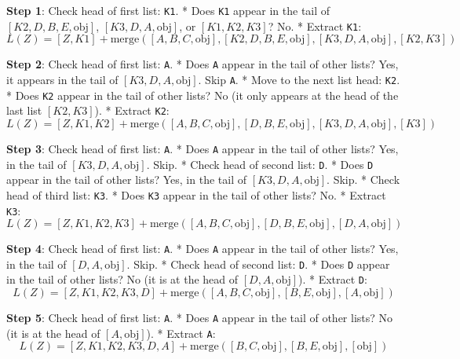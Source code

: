 \textbf{Step 1}: Check head of first list: \passthrough{\lstinline!K1!}.
* Does \passthrough{\lstinline!K1!} appear in the tail of
\([K2, D, B, E, \text{obj}]\), \([K3, D, A, \text{obj}]\), or
\([K1, K2, K3]\)? No. * Extract \passthrough{\lstinline!K1!}:
\[L(Z) = [Z, K1] + \text{merge}\left([A, B, C, \text{obj}], [K2, D, B, E, \text{obj}], [K3, D, A, \text{obj}], [K2, K3]\right)\]

\textbf{Step 2}: Check head of first list: \passthrough{\lstinline!A!}.
* Does \passthrough{\lstinline!A!} appear in the tail of other lists?
Yes, it appears in the tail of \([K3, D, A, \text{obj}]\). Skip
\passthrough{\lstinline!A!}. * Move to the next list head:
\passthrough{\lstinline!K2!}. * Does \passthrough{\lstinline!K2!} appear
in the tail of other lists? No (it only appears at the head of the last
list \([K2, K3]\)). * Extract \passthrough{\lstinline!K2!}:
\[L(Z) = [Z, K1, K2] + \text{merge}\left([A, B, C, \text{obj}], [D, B, E, \text{obj}], [K3, D, A, \text{obj}], [K3]\right)\]

\textbf{Step 3}: Check head of first list: \passthrough{\lstinline!A!}.
* Does \passthrough{\lstinline!A!} appear in the tail of other lists?
Yes, in the tail of \([K3, D, A, \text{obj}]\). Skip. * Check head of
second list: \passthrough{\lstinline!D!}. * Does
\passthrough{\lstinline!D!} appear in the tail of other lists? Yes, in
the tail of \([K3, D, A, \text{obj}]\). Skip. * Check head of third
list: \passthrough{\lstinline!K3!}. * Does \passthrough{\lstinline!K3!}
appear in the tail of other lists? No. * Extract
\passthrough{\lstinline!K3!}:
\[L(Z) = [Z, K1, K2, K3] + \text{merge}\left([A, B, C, \text{obj}], [D, B, E, \text{obj}], [D, A, \text{obj}]\right)\]

\textbf{Step 4}: Check head of first list: \passthrough{\lstinline!A!}.
* Does \passthrough{\lstinline!A!} appear in the tail of other lists?
Yes, in the tail of \([D, A, \text{obj}]\). Skip. * Check head of second
list: \passthrough{\lstinline!D!}. * Does \passthrough{\lstinline!D!}
appear in the tail of other lists? No (it is at the head of
\([D, A, \text{obj}]\)). * Extract \passthrough{\lstinline!D!}:
\[L(Z) = [Z, K1, K2, K3, D] + \text{merge}\left([A, B, C, \text{obj}], [B, E, \text{obj}], [A, \text{obj}]\right)\]

\textbf{Step 5}: Check head of first list: \passthrough{\lstinline!A!}.
* Does \passthrough{\lstinline!A!} appear in the tail of other lists? No
(it is at the head of \([A, \text{obj}]\)). * Extract
\passthrough{\lstinline!A!}:
\[L(Z) = [Z, K1, K2, K3, D, A] + \text{merge}\left([B, C, \text{obj}], [B, E, \text{obj}], [\text{obj}]\right)\]

